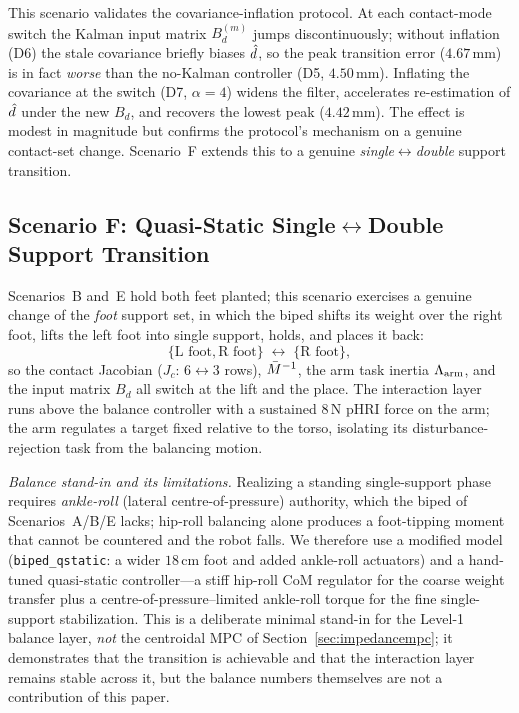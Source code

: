 This scenario validates the covariance-inflation protocol. At each contact-mode
switch the Kalman input matrix $B_d^{(m)}$ jumps discontinuously; without
inflation (D6) the stale covariance briefly biases $\hat{d}$, so the peak
transition error ($4.67$\,mm) is in fact \emph{worse} than the no-Kalman
controller (D5, $4.50$\,mm). Inflating the covariance at the switch
(D7, $\alpha=4$) widens the filter, accelerates re-estimation of $\hat{d}$ under
the new $B_d$, and recovers the lowest peak ($4.42$\,mm). The effect is modest
in magnitude but confirms the protocol's mechanism on a genuine contact-set
change. Scenario~F extends this to a genuine \emph{single$\leftrightarrow$double}
support transition.

\subsection{Scenario F: Quasi-Static Single$\leftrightarrow$Double Support Transition}
\label{sec:scenarioF}
Scenarios~B and~E hold both feet planted; this scenario exercises a genuine
change of the \emph{foot} support set, in which the biped shifts its weight over
the right foot, lifts the left foot into single support, holds, and places it
back:
\begin{equation*}
\{\text{L foot},\text{R foot}\}\;\longleftrightarrow\;\{\text{R foot}\},
\end{equation*}
so the contact Jacobian ($J_c$: $6\leftrightarrow3$ rows), $\bar{M}^{-1}$, the arm task
inertia $\Lambda_{\text{arm}}$, and the input matrix $B_d$ all switch at the lift and the place.
The interaction layer runs above the balance controller with a sustained
$8$\,N pHRI force on the arm; the arm regulates a target fixed relative to the
torso, isolating its disturbance-rejection task from the balancing motion.

\emph{Balance stand-in and its limitations.} Realizing a standing single-support
phase requires \emph{ankle-roll} (lateral centre-of-pressure) authority, which
the biped of Scenarios~A/B/E lacks; hip-roll balancing alone produces a
foot-tipping moment that cannot be countered and the robot falls. We therefore
use a modified model (\texttt{biped\_qstatic}: a wider $18$\,cm foot and added
ankle-roll actuators) and a hand-tuned quasi-static controller---a stiff
hip-roll CoM regulator for the coarse weight transfer plus a
centre-of-pressure--limited ankle-roll torque for the fine single-support
stabilization. This is a deliberate minimal stand-in for the Level-1 balance
layer, \emph{not} the centroidal MPC of Section~\ref{sec:impedancempc}; it
demonstrates that the transition is achievable and that the interaction layer
remains stable across it, but the balance numbers themselves are not a
contribution of this paper.

